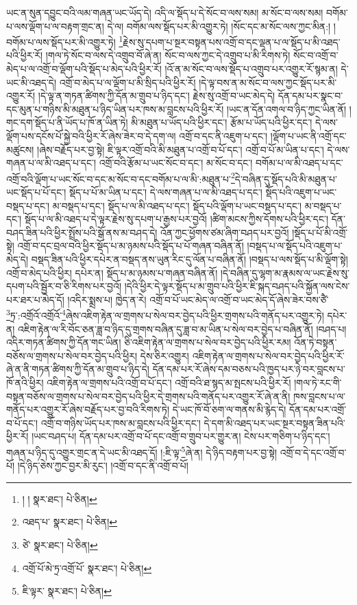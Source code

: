 ཡང་ན་སུན་དབྱུང་བའི་ལམ་གཞན་ཡང་ཡོད་དེ། འདི་ལ་སྡོད་པ་དེ་སོང་བ་ལས་སམ། མ་སོང་བ་ལས་སམ། བགོམ་པ་ལས་ལྡོག་པ་ལ་བརྟག་གྲང་ན། དེ་ལ། བགོམ་ལས་སྡོད་པར་མི་འགྱུར་ཏེ། །སོང་དང་མ་སོང་ལས་ཀྱང་མིན:། །བགོམ་པ་ལས་སྡོད་པར་མི་འགྱུར་ཏེ། \footnote{། །   སྣར་ཐང་།  པེ་ཅིན། }རྗེས་སུ་དཔག་པ་སྔར་བསྟན་པས་འགྲོ་བ་དང་ལྡན་པ་ལ་སྡོད་པ་མི་འཐད་པའི་ཕྱིར་རོ། །གལ་ཏེ་སོང་བ་ལས་དེ་འགྲུབ་བོ་ཞེ་ན། སོང་བ་ལས་ཀྱང་དེ་འགྲུབ་པ་མི་རིགས་ཏེ། སོང་བ་འགྲོ་བ་མེད་པ་ལ་འགྲོ་བ་ལྡོག་པའི་སྡོད་པ་མེད་པའི་ཕྱིར་རོ། །འོ་ན་མ་སོང་བ་ལས་སྡོད་པ་འགྲུབ་པར་འགྱུར་རོ་སྙམ་ན། དེ་ཡང་མི་འཐད་དེ། འགྲོ་བ་མེད་པ་ལ་ལྡོག་པ་མི་སྲིད་པའི་ཕྱིར་རོ། །དེ་ལྟ་བས་ན་མ་སོང་བ་ལས་ཀྱང་སྡོད་པར་མི་འགྱུར་རོ། །དེ་ལྟ་ན་གཏན་ཚིགས་ཀྱི་དོན་མ་གྲུབ་པ་ཉིད་དང་། རྗེས་སུ་འགྲོ་བ་ཡང་མེད་དེ། དོན་དམ་པར་སྣང་བ་དང་མུན་པ་གཉིས་མི་མཐུན་པ་ཉིད་ཡིན་པར་ཁས་མ་བླངས་པའི་ཕྱིར་རོ། །ཡང་ན་དོན་འགལ་བ་ཉིད་ཀྱང་ཡིན་ནོ། །གང་དག་སྡོད་པ་ནི་ཡོད་པ་ཁོ་ན་ཡིན་ཏེ། མི་མཐུན་པ་ཡོད་པའི་ཕྱིར་དང་། རྩོམ་པ་ཡོད་པའི་ཕྱིར་དང་། དེ་ལས་ལྡོག་པས་དངོས་པོ་སྐྱེ་བའི་ཕྱིར་རོ་ཞེས་ཟེར་བ་དེ་དག་ལ། འགྲོ་བ་དང་ནི་འཇུག་པ་དང་། །ལྡོག་པ་ཡང་ནི་འགྲོ་དང་མཚུངས། །ཞེས་བརྗོད་པར་བྱ་སྟེ། ཇི་ལྟར་འགྲོ་བའི་མི་མཐུན་པ་འགྲོ་བ་པོ་དང་། འགྲོ་བ་པོ་མ་ཡིན་པ་དང་། དེ་ལས་གཞན་པ་ལ་མི་འཐད་པ་དང་། འགྲོ་བའི་རྩོམ་པ་ཡང་སོང་བ་དང་། མ་སོང་བ་དང་། བགོམ་པ་ལ་མི་འཐད་པ་དང་འགྲོ་བའི་ལྡོག་པ་ཡང་སོང་བ་དང་མ་སོང་བ་དང་བགོམ་པ་ལ་མི་:མཐུན་པ་\footnote{འཐད་པ་  སྣར་ཐང་།  པེ་ཅིན། }དེ་བཞིན་དུ་སྡོད་པའི་མི་མཐུན་པ་ཡང་སྡོད་པ་པོ་དང་། སྡོད་པ་པོ་མ་ཡིན་པ་དང་། དེ་ལས་གཞན་པ་ལ་མི་འཐད་པ་དང་། སྡོད་པའི་འཇུག་པ་ཡང་བསྡད་པ་དང་། མ་བསྡད་པ་དང་། སྡོད་པ་ལ་མི་འཐད་པ་དང་། སྡོད་པའི་ལྡོག་པ་ཡང་བསྡད་པ་དང་། མ་བསྡད་པ་དང་། སྡོད་པ་ལ་མི་འཐད་པ་དེ་ལྟར་རྗེས་སུ་དཔག་པ་རྒྱས་པར་བྱའོ། །ཚིག་མངས་ཀྱིས་དོགས་པའི་ཕྱིར་དང་། དོན་བཤད་ཟིན་པའི་ཕྱིར་སྤྲོས་པའི་སྒོ་ནས་མ་བཤད་དེ། འོན་ཀྱང་ཕྱོགས་ཙམ་ཞིག་བཤད་པར་བྱའོ། །སྡོད་པ་པོ་མི་འགྲོ་སྟེ། འགྲོ་བ་དང་བྲལ་བའི་ཕྱིར་སྡོད་པ་མ་ཉམས་པའི་སྡོད་པ་པོ་གཞན་བཞིན་ནོ། །བསྡད་པ་ལ་སྡོད་པའི་འཇུག་པ་མེད་དེ། བསྡད་ཟིན་པའི་ཕྱིར་དཔེར་ན་བསྡད་ནས་ཡུན་རིང་དུ་ལོན་པ་བཞིན་ནོ། །བསྡད་པ་ལས་སྡོད་པ་མི་ལྡོག་སྟེ། འགྲོ་བ་མེད་པའི་ཕྱིར། དཔེར་ན། སྡོད་པ་མ་ཉམས་པ་གཞན་བཞིན་ནོ། །དེ་བཞིན་དུ་ལྷག་མ་རྣམས་ལ་ཡང་རྗེས་སུ་དཔག་པའི་སྦྱོར་བ་ཅི་རིགས་པར་བྱའོ། །དེའི་ཕྱིར་དེ་ལྟར་སྡོད་པ་མ་གྲུབ་པའི་ཕྱིར་ཇི་སྐད་བཤད་པའི་སྐྱོན་ལས་ངེས་པར་ཐར་པ་མེད་དོ། །འདིར་སྨྲས་པ། ཁྱེད་ན་རེ། འགྲོ་བ་པོ་ཡང་མེད་ལ་འགྲོ་བ་ཡང་མེད་དོ་ཞེས་ཟེར་བས་ཙཻ་\footnote{ཙེ་  སྣར་ཐང་།  པེ་ཅིན། }ཏྲ་:འགྲོའོ་འགྲོའོ་\footnote{འགྲོ་པོ་མེ་ཏྲ་འགྲོ་པོ་  སྣར་ཐང་།  པེ་ཅིན། }ཞེས་འཇིག་རྟེན་ལ་གྲགས་པ་སེལ་བར་བྱེད་པའི་ཕྱིར་གྲགས་པའི་གནོད་པར་འགྱུར་ཏེ། དཔེར་ན། འཇིག་རྟེན་ལ་རི་བོང་ཅན་ཟླ་བ་ཉིད་དུ་གྲགས་བཞིན་དུ་ཟླ་བ་མ་ཡིན་པ་སེལ་བར་བྱེད་པ་བཞིན་ནོ། །བཤད་པ། འདིར་གཏན་ཚིགས་ཀྱི་དོན་གང་ཡིན། ཅི་འཇིག་རྟེན་ལ་གྲགས་པ་སེལ་བར་བྱེད་པའི་ཕྱིར་རམ། འོན་ཏེ་བསྟན་བཅོས་ལ་གྲགས་པ་སེལ་བར་བྱེད་པའི་ཕྱིར། དེས་ཅིར་འགྱུར། འཇིག་རྟེན་ལ་གྲགས་པ་སེལ་བར་བྱེད་པའི་ཕྱིར་རོ་ཞེ་ན་ནི་གཏན་ཚིགས་ཀྱི་དོན་མ་གྲུབ་པ་ཉིད་དེ། དོན་དམ་པར་རོ་ཞེས་དམ་བཅས་པའི་ཁྱད་པར་ཉེ་བར་བླངས་པ་ཁོ་ནའི་ཕྱིར། འཇིག་རྟེན་ལ་གྲགས་པའི་འགྲོ་བ་པོ་དང་། འགྲོ་བའི་ཐ་སྙད་མ་སྤངས་པའི་ཕྱིར་རོ། །གལ་ཏེ་རང་གི་བསྟན་བཅོས་ལ་གྲགས་པ་སེལ་བར་བྱེད་པའི་ཕྱིར་དེ་གྲགས་པའི་གནོད་པར་འགྱུར་རོ་ཞེ་ན་ནི། ཁས་བླངས་པ་ལ་གནོད་པར་འགྱུར་རོ་ཞེས་བརྗོད་པར་བྱ་བའི་རིགས་ཏེ། དེ་ཡང་ཁོ་བོ་ཅག་ལ་གནས་མི་རྙེད་དེ། དོན་དམ་པར་འགྲོ་བ་པོ་དང་། འགྲོ་བ་གཉིས་ཡོད་པར་ཁས་མ་བླངས་པའི་ཕྱིར་དང་། དེ་དག་མི་འཐད་པར་ཡང་སྔར་བསྟན་ཟིན་པའི་ཕྱིར་རོ། །ཡང་བཤད་པ། དོན་དམ་པར་འགྲོ་བ་པོ་དང་འགྲོ་བ་གྲུབ་པར་གྱུར་ན། ངེས་པར་གཅིག་པ་ཉིད་དང་། གཞན་པ་ཉིད་དུ་འགྱུར་གྲང་ན་དེ་ཡང་མི་འཐད་དོ། །:ཇི་ལྟ་\footnote{ཇི་ལྟར་  སྣར་ཐང་།  པེ་ཅིན། }ཞེ་ན། དེ་ཉིད་བརྟག་པར་བྱ་སྟེ། འགྲོ་བ་དེ་དང་འགྲོ་བ་པོ། །དེ་ཉིད་ཅེས་ཀྱང་བྱར་མི་རུང་། །འགྲོ་བ་དང་ནི་འགྲོ་བ་པོ། 